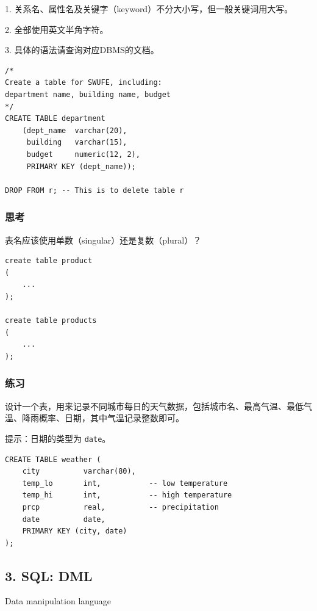 \documentclass[aspectratio=169, 14pt]{beamer}
\begin{document}
{
\begin{frame}[standout]
    1. 关系名、属性名及关键字（keyword）不分大小写，但一般关键词用大写。

    2. 全部使用英文半角字符。

    3. 具体的语法请查询对应DBMS的文档。
\end{frame}
}

\begin{frame}[fragile]
    \begin{verbatim}
/*
Create a table for SWUFE, including:
department name, building name, budget
*/        
CREATE TABLE department
    (dept_name  varchar(20),
     building   varchar(15),
     budget     numeric(12, 2),
     PRIMARY KEY (dept_name)); 

DROP FROM r; -- This is to delete table r
    \end{verbatim}
\end{frame}
\begin{frame}[fragile]
    \frametitle{思考}
表名应该使用单数（singular）还是复数（plural）？

\begin{verbatim}
create table product
(
    ...
);

create table products
(
    ...
);
\end{verbatim}
\end{frame}
\begin{frame}
    \frametitle{练习}
    
    设计一个表，用来记录不同城市每日的天气数据，包括城市名、最高气温、最低气温、降雨概率、日期，其中气温记录整数即可。

    提示：日期的类型为 \texttt{date}。
\end{frame}

\begin{frame}[fragile]
    \begin{verbatim}
CREATE TABLE weather (
    city          varchar(80),
    temp_lo       int,           -- low temperature
    temp_hi       int,           -- high temperature
    prcp          real,          -- precipitation
    date          date,
    PRIMARY KEY (city, date)
);
    \end{verbatim}
\end{frame}

\begin{frame}
    \section{\textcolor{darkmidnightblue}{3. SQL: DML}}
    Data manipulation language

\end{frame}
\end{document}

